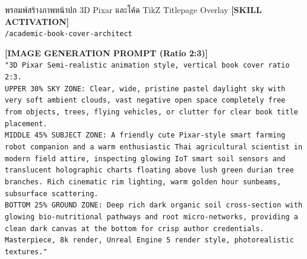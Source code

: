 \begin{promptbox}{พรอมพ์สร้างภาพหน้าปก 3D Pixar และโค้ด TikZ Titlepage Overlay}
\small
\textbf{[SKILL ACTIVATION]}\\
\texttt{/academic-book-cover-architect}

\vspace{4pt}
\textbf{[IMAGE GENERATION PROMPT (Ratio 2:3)]}\\
\texttt{"3D Pixar Semi-realistic animation style, vertical book cover ratio 2:3.}\\
\texttt{UPPER 30\% SKY ZONE: Clear, wide, pristine pastel daylight sky with very soft ambient clouds, vast negative open space completely free from objects, trees, flying vehicles, or clutter for clear book title placement.}\\
\texttt{MIDDLE 45\% SUBJECT ZONE: A friendly cute Pixar-style smart farming robot companion and a warm enthusiastic Thai agricultural scientist in modern field attire, inspecting glowing IoT smart soil sensors and translucent holographic charts floating above lush green durian tree branches. Rich cinematic rim lighting, warm golden hour sunbeams, subsurface scattering.}\\
\texttt{BOTTOM 25\% GROUND ZONE: Deep rich dark organic soil cross-section with glowing bio-nutritional pathways and root micro-networks, providing a clean dark canvas at the bottom for crisp author credentials. Masterpiece, 8k render, Unreal Engine 5 render style, photorealistic textures."}


\end{promptbox}

